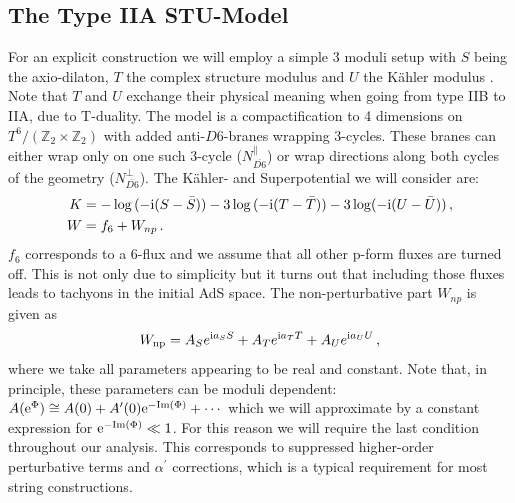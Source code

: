 \documentclass[12pt]{report}
\newcommand{\be}{\begin{equation}}
\newcommand{\ee}{\end{equation}}
\newcommand{\bea}{\begin{equation}\begin{aligned}}
\newcommand{\eea}{\end{aligned}\end{equation}}
\def\rmi{{\rm i}}
\def\rme{{\rm e}}
\def\rmim{{\rm Im}}
\begin{document}
\subsection{The Type IIA STU-Model}
\label{sec:antibraneupSTU}
For an explicit construction we will employ a simple 3 moduli setup with $S$ being the axio-dilaton, $T$ the complex structure modulus and $U$ the Kähler modulus \cite{Dibitetto:2011gm,Danielsson:2013rza}. Note that $T$ and $U$ exchange their physical meaning when going from type IIB to IIA, due to T-duality. %
The model is a compactification to 4 dimensions on $T^6/(\mathbb{Z}_2 \times \mathbb{Z}_2)$ with added anti-$D6$-branes wrapping 3-cycles. These branes can either wrap only on one such 3-cycle ($N_{\overline{D6}}^\parallel$) or wrap directions along both cycles of the geometry ($N_{\overline{D6}}^\perp$). The Kähler- and Superpotential we will consider are:
\bea
K &= -\log{(-\rmi (S- \bar{S}))} - 3\log{(-\rmi (T- \bar{T}))} - 3\log(-\rmi (U- \bar{U}))\,,\\
W &= f_6 + W_{np}\,.
\eea
$f_6$ corresponds to a 6-flux and we assume that all other p-form fluxes are turned off. This is not only due to simplicity but it turns out that including those fluxes leads to tachyons in the initial AdS space. The non-perturbative part $W_{np}$ is given as
\be 
W_{\text{np}} = A_S e^{\rmi a_S S} + A_T e^{\rmi a_T T} + A_U e^{\rmi a_U U}\,,
\label{eq:Wnonpert}
\ee
where we take all parameters appearing to be real and constant. Note that, in principle, these parameters can be moduli dependent: $A(\rme^\Phi) \cong A(0) + A^\prime (0) \rme^{-\rmim (\Phi)} + \cdots$ which we will approximate by a constant expression for $\rme^{-\rmim ( \Phi)}\ll 1$. For this reason we will require the last condition throughout our analysis. This corresponds to suppressed higher-order perturbative terms and $\alpha^\prime$ corrections, which is a typical requirement for most string constructions. \\
\end{document}
